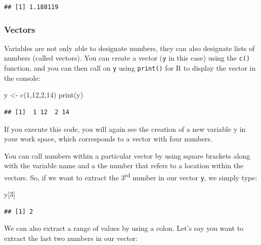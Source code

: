 \documentclass[
]{book}
\newenvironment{Shaded}{\begin{snugshade}}{\end{snugshade}}
\newcommand{\DecValTok}[1]{\textcolor[rgb]{0.00,0.00,0.81}{#1}}
\newcommand{\FunctionTok}[1]{\textcolor[rgb]{0.00,0.00,0.00}{#1}}
\newcommand{\NormalTok}[1]{#1}
\newcommand{\OtherTok}[1]{\textcolor[rgb]{0.56,0.35,0.01}{#1}}
\begin{document}
\begin{verbatim}
## [1] 1.188119
\end{verbatim}

\hypertarget{vectors}{%
\subsubsection*{Vectors}\label{vectors}}

Variables are not only able to designate numbers, they can also designate lists of numbers (called vectors). You can create a vector (\texttt{y} in this case) using the \texttt{c()} function, and you can then call on \texttt{y} using \texttt{print()} for R to display the vector in the console:

\begin{Shaded}
\begin{Highlighting}[]
\NormalTok{y }\OtherTok{\textless{}{-}} \FunctionTok{c}\NormalTok{(}\DecValTok{1}\NormalTok{,}\DecValTok{12}\NormalTok{,}\DecValTok{2}\NormalTok{,}\DecValTok{14}\NormalTok{)}
\FunctionTok{print}\NormalTok{(y)}
\end{Highlighting}
\end{Shaded}

\begin{verbatim}
## [1]  1 12  2 14
\end{verbatim}

If you execute this code, you will again see the creation of a new variable y in your work space, which corresponds to a vector with four numbers.

You can call numbers within a particular vector by using square brackets along with the variable name and a the number that refers to a location within the vectors. So, if we want to extract the 3\textsuperscript{rd} number in our vector \texttt{y}, we simply type:

\begin{Shaded}
\begin{Highlighting}[]
\NormalTok{y[}\DecValTok{3}\NormalTok{]}
\end{Highlighting}
\end{Shaded}

\begin{verbatim}
## [1] 2
\end{verbatim}

We can also extract a range of values by using a colon. Let's say you want to extract the last two numbers in our vector:
\end{document}
